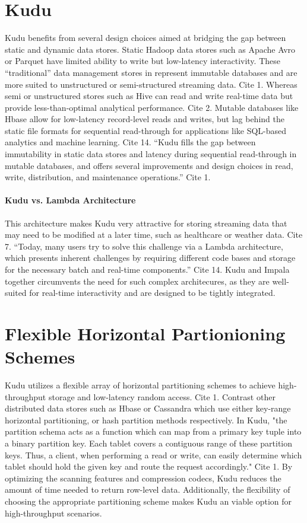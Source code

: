 \section{Kudu}
Kudu benefits from several design choices aimed at bridging the gap
between static and dynamic data stores. Static Hadoop data stores
such as Apache Avro or Parquet have limited ability to write but
low-latency interactivity. These ``traditional'' data management
stores in represent immutable databases and are more suited to
unstructured or semi-structured streaming data. Cite 1. Whereas semi
or unstructured stores such as Hive can read and write real-time data
but provide less-than-optimal analytical performance. Cite 2. Mutable
databases like Hbase allow for low-latency record-level reads and
writes, but lag behind the static file formats for sequential
read-through for applications like SQL-based analytics and machine
learning.  Cite 14. ``Kudu fills the gap between immutability in static data stores and latency during sequential read-through in
mutable databases, and offers several improvements and design choices
in read, write, distribution, and maintenance operations.''  Cite 1.

\paragraph{Kudu vs. Lambda Architecture}
This architecture makes Kudu very attractive for storing streaming
data that may need to be modified at a later time, such as healthcare
or weather data. Cite 7. ``Today, many users try to solve this
challenge via a Lambda architecture, which presents inherent
challenges by requiring different code bases and storage for the
necessary batch and real-time components.'' Cite 14. Kudu and Impala
together circumvents the need for such complex architecures, as they
are well-suited for real-time interactivity and are designed to be
tightly integrated.  

\section{Flexible Horizontal Partionioning Schemes}
Kudu utilizes a flexible array of horizontal partitioning schemes to
achieve high-throughput storage and low-latency random access. Cite
1. Contrast other distributed data stores such as Hbase or Cassandra
which use either key-range horizontal partitioning, or hash partition
methods respectively. In Kudu, "the partition schema acts as a
function which can map from a primary key tuple into a binary
partition key.  Each tablet covers a contiguous  range  of  these
partition keys. Thus,  a client, when performing a read or write, can
easily determine which tablet should hold the given key and route the
request accordingly." Cite 1. By optimizing the scanning features and
compression codecs, Kudu reduces the amount of time needed to return
row-level data. Additionally, the flexibility of choosing the
appropriate partitioning scheme makes Kudu an viable option for
high-throughput scenarios.

